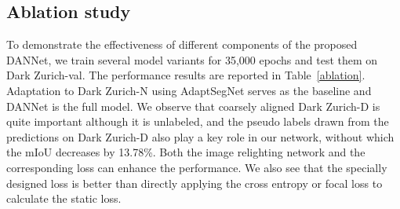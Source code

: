 \documentclass[final]{cvpr}
\begin{document}
\begin{table}[!ht]
	\centering\footnotesize
	\caption{Comparison of our DANNet  with some existing state-of-the-art methods on Nighttime Driving test set \cite{dai2018dark}.}
	\vspace{4pt}
	\label{ND-test}
	\renewcommand\arraystretch{1.08}
	\vspace{-5pt}
\end{table}

\subsection{Ablation study}
To demonstrate the effectiveness of different components of the proposed DANNet, we train several model variants for 35,000 epochs and test them on  Dark Zurich-val. The performance results are  reported in Table~\ref{ablation}. 
Adaptation to Dark Zurich-N using AdaptSegNet \cite{tsai2018learning} serves as the baseline and DANNet is the full model. 
We observe that coarsely aligned Dark Zurich-D is quite important although it is unlabeled, and the pseudo labels drawn from the predictions on Dark Zurich-D also play a key role in our network, without which the mIoU decreases by 13.78\%. 
Both the image relighting network and the corresponding loss  can enhance the performance. 
We also see that the specially designed loss  is better than directly applying the cross entropy  or  focal loss to calculate the static loss. 
\end{document}
